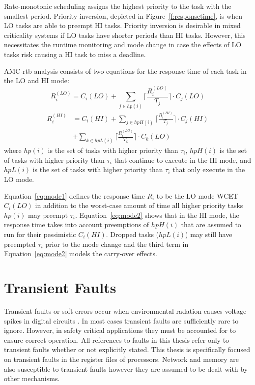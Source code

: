 	Rate-monotonic scheduling assigns the highest priority to the task with the smallest period. Priority inversion, depicted in Figure~\ref{f:responsetime}, is when LO tasks are able to preempt HI tasks. Priority inversion is desirable in mixed criticality systems if LO tasks have shorter periods than HI tasks. However, this necessitates the runtime monitoring and mode change in case the effects of LO tasks risk causing a HI task to miss a deadline.


AMC-rtb analysis consists of two equations for the response time of each task in the LO and HI mode:
\begin{equation}
R_i^{(LO)}= C_i(LO)+\sum_{j \in hp(i)}\Big\lceil\frac{R_i^{(LO)}}{T_j}\Big\rceil \cdot C_j(LO)
\label{eq:mode1}
\end{equation}
\begin{equation}
\begin{aligned}
R_i^{(HI)} &  = C_i(HI)+\sum_{j \in hpH(i)}\Big\lceil\frac{R_i^{(HI)}}{T_j}\Big\rceil \cdot C_j(HI) \\
&  +\sum_{k \in hpL(i)}\Big\lceil\frac{R_i^{(LO)}}{T_k}\Big\rceil \cdot C_k(LO)
\end{aligned}
\label{eq:mode2}
\end{equation}
where $hp(i)$ is the set of tasks with higher priority than $\tau_i$, $hpH(i)$ is the set of tasks with higher priority than $\tau_i$ that continue to execute in the HI mode, and $hpL(i)$ is the set of tasks with higher priority than $\tau_i$ that only execute in the LO mode.

	Equation~\ref{eq:mode1} defines the response time $R_i$ to be the LO mode WCET $C_i(LO)$ in addition to the worst-case amount of time all higher priority tasks $hp(i)$ may preempt $\tau_i$. 
	Equation~\ref{eq:mode2} shows that in the HI mode, the response time takes into account preemptions of $hpH(i)$ that are assumed to run for their pessimistic $C_i(HI)$. 
	Dropped tasks ($hpL(i)$) may still have preempted $\tau_i$ prior to the mode change and the third term in Equation~\ref{eq:mode2} models the carry-over effects.

\section{Transient Faults}

	Transient faults or soft errors occur when environmental radation causes voltage spikes in digital circuits \cite{Baumann:05}. 
	In most cases transient faults are sufficiently rare to ignore. 
	However, in safety critical applications they must be accounted for to ensure correct operation. 
	All references to faults in this thesis refer only to transient faults whether or not explicitly stated. 
	This thesis is specifically focused on transient faults in the register files of processors. 
	Network and memory are also susceptible to transient faults however they are assumed to be dealt with by other mechanisms.


